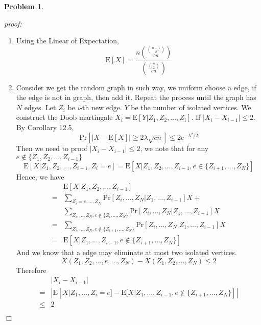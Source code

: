 \documentclass{article}
\newtheorem{problem}[theorem]{Problem}
\newenvironment{solution}{\noindent \textit{proof:}}{$\Box$}
\begin{document}
\begin{problem}
\end{problem}
\begin{solution}
    \begin{enumerate}
        \item Using the Linear of Expectation, 
        $$\mathrm{E}[X] = \frac {n\binom{\binom{n-1}{2}}{cn}} {\binom{\binom{n}{2}}{cn}}$$
        \item Consider we get the random graph in such way, we uniform choose a edge, if the edge is not in graph, then add it. Repeat the process until the graph has $N$ edges. Let $Z_i$ be $i$-th new edge. $Y$ be the number of isolated vertices. 
        We construct the Doob martingale $X_i = \mathrm{E}[Y|Z_1, Z_2, \dots, Z_i]$. If $|X_i-X_{i-1}| \leq 2$. By Corollary 12.5, 
        $$
        \mathrm{Pr}[|X-\mathrm{E}[X]|\geq 2\lambda\sqrt{cn}] \leq 2 e^{-\lambda^2/2}
        $$
        Then we need to proof $|X_i-X_{i-1}| \leq 2$, 
        we note that for any $e \not\in \{ Z_1, Z_2, \dots, Z_{i-1} \}$
        $$
        \mathrm{E}[X|Z_1,Z_2,\dots,Z_{i-1},Z_i=e] = 
        \mathrm{E}[X|Z_1,Z_2,\dots,Z_{i-1}, e \in \{ Z_{i+1}, \dots, Z_N \}]
        $$
        Hence, we have
        \begin{align*}
             &\mathrm{E}[X|Z_1,Z_2,\dots,Z_{i-1}] \\
            =& \sum_{Z_i=e, \dots, Z_N} \mathrm{Pr}[Z_i,\dots, Z_N|Z_1, \dots,Z_{i-1}]X +\\
            &\sum_{Z_i, \dots, Z_N, e \not\in \{ Z_i,\dots, Z_N \}} \mathrm{Pr}[Z_i,\dots, Z_N|Z_1, \dots,Z_{i-1}]X \\
            =& \sum_{Z_i, \dots, Z_N, e \not\in \{ Z_{i+1},\dots, Z_N \}}
            \mathrm{Pr}[Z_i,\dots, Z_N|Z_1, \dots,Z_{i-1}]X \\
            =& \mathrm{E}[X|Z_1, \dots,Z_{i-1},e\not\in \{ Z_{i+1}, \dots, Z_N\}]
        \end{align*}
        And we know that a edge may eliminate at most two isolated vertices. 
        $$
        X(Z_1,Z_2,\dots,e,\dots,Z_N)-
        X(Z_1,Z_2,\dots,Z_N) \leq 2
        $$
        Therefore
        \begin{align*}
            &|X_i-X_{i-1}|  \\
            =&|\mathrm{E}[X|Z_1,\dots,Z_i=e]-\mathrm{E}[X|Z_1, \dots,Z_{i-1},e\not\in \{ Z_{i+1}, \dots, Z_N\}]| \\
            \leq& 2
        \end{align*}
        
    \end{enumerate}
\end{solution}
\end{document}
